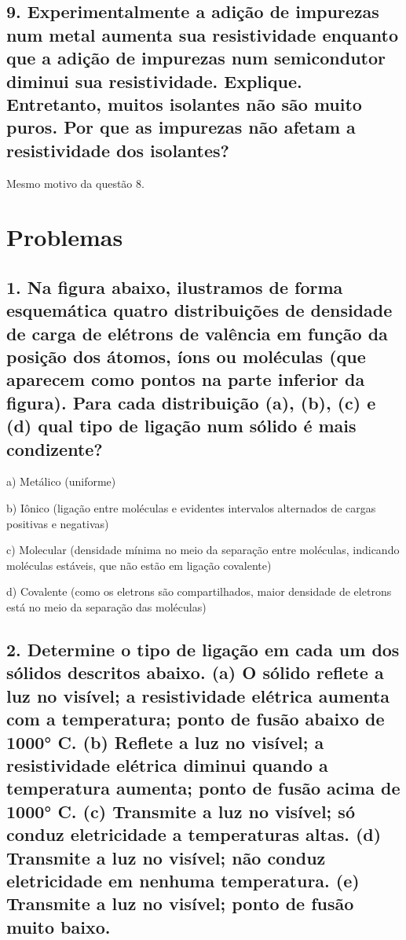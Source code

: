 \documentclass{article}
\begin{document}
\subsection{9. Experimentalmente a adição de impurezas num metal aumenta sua resistividade  enquanto que a adição de impurezas num semicondutor diminui sua resistividade.  Explique. Entretanto, muitos isolantes não são muito puros. Por que as impurezas não  afetam a resistividade dos isolantes? }

Mesmo motivo da questão 8.

\pagebreak
\section{Problemas}

\subsection{1. Na figura abaixo, ilustramos de forma esquemática quatro distribuições de densidade  de carga de elétrons de valência em função da posição dos átomos, íons ou moléculas  (que aparecem como pontos na parte inferior da figura). Para cada distribuição (a), (b),  (c) e (d) qual tipo de ligação num sólido é mais condizente?}


a) Metálico (uniforme)

b) Iônico (ligação entre moléculas e evidentes intervalos alternados de cargas positivas e negativas)

c) Molecular (densidade mínima no meio da separação entre moléculas, indicando moléculas estáveis, que não estão em ligação covalente)

d) Covalente (como os eletrons são compartilhados, maior densidade de eletrons está no meio da separação das moléculas)



\subsection{2. Determine o tipo de ligação em cada um dos sólidos descritos abaixo. (a) O sólido  reflete a luz no visível; a resistividade elétrica aumenta com a temperatura; ponto de  fusão abaixo de 1000° C. (b) Reflete a luz no visível; a resistividade elétrica diminui  quando a temperatura aumenta; ponto de fusão acima de 1000° C. (c) Transmite a luz  no visível; só conduz eletricidade a temperaturas altas. (d) Transmite a luz no visível;  não conduz eletricidade em nenhuma temperatura. (e) Transmite a luz no visível; ponto  de fusão muito baixo.}
\end{document}
